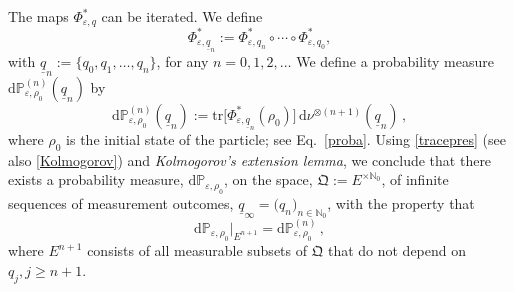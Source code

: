 \documentclass[12pt]{article}
\begin{document}
The maps $\Phi_{\varepsilon, q}^{*}$ can be iterated. We define 
\begin{equation}\label{iterated state}
\Phi_{\varepsilon,\underline{q}_n}^{*} := \Phi_{\varepsilon,q_n}^{*}\circ \cdots \circ \Phi_{\varepsilon,q_0}^{*},
\end{equation}
with $\underline{q}_{n}:=\big\{q_0, q_1, \dots, q_n\big\}$, for any $n=0, 1,2, \dots$ 
We define a probability measure $\text{d}\mathbb{P}_{\varepsilon,\rho_0}^{(n)}(\underline{q}_n)$ by
\begin{equation}\label{prob-measure}
\text{d}\mathbb{P}^{(n)}_{\varepsilon, \rho_0}(\underline{q}_n):= \text{tr}\big[\Phi^{*}_{\varepsilon, \underline{q}_n}(\rho_0)\big]\, \text{d}\nu^{\otimes (n+1)}(\underline{q}_n)\,,
\end{equation}
where $\rho_0$ is the initial state of the particle; see Eq.~\eqref{proba}. Using \eqref{tracepres} 
(see also \eqref{Kolmogorov}) and \textit{Kolmogorov's extension lemma}, we conclude that there exists a probability measure, 
$\text{d}\mathbb{P}_{\varepsilon, \rho_0}$, on the space, $\mathfrak{Q}:=E^{\times\mathbb{N}_0}$, of infinite sequences 
of measurement outcomes, $\underline{q}_{\infty}= \big(q_n\big)_{n\in \mathbb{N}_0}$, with the property that 
\begin{equation}\label{P-meas}
\text{d}\mathbb{P}_{\varepsilon, \rho_0}\big|_{E^{n+1}}= \text{d}\mathbb{P}^{(n)}_{\varepsilon, \rho_0}\,,
\end{equation}
where $E^{n+1}$ consists of all measurable subsets of $\mathfrak{Q}$ that do not depend on $q_j, j\geq n+1$. 
\end{document}
